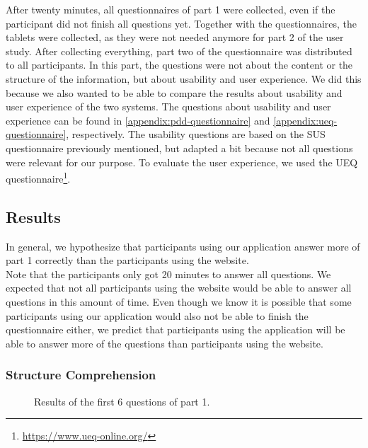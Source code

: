 After twenty minutes, all questionnaires of part 1 were collected, even if the participant did not finish all questions yet. Together with the questionnaires, the tablets were collected, as they were not needed anymore for part 2 of the user study. After collecting everything, part two of the questionnaire was distributed to all participants. In this part, the questions were not about the content or the structure of the information, but about usability and user experience. We did this because we also wanted to be able to compare the results about usability and user experience of the two systems. The questions about usability and user experience can be found in \autoref{appendix:pdd-questionnaire} and \autoref{appendix:ueq-questionnaire}, respectively. The usability questions are based on the SUS questionnaire previously mentioned, but adapted a bit because not all questions were relevant for our purpose. To evaluate the user experience, we used the UEQ questionnaire\footnote{\url{https://www.ueq-online.org/}}.



\subsection{Results}
In general, we hypothesize that participants using our application answer more of part 1 correctly than the participants using the website.\\

Note that the participants only got 20 minutes to answer all questions. We expected that not all participants using the website would be able to answer all questions in this amount of time. Even though we know it is possible that some participants using our application would also not be able to finish the questionnaire either, we predict that participants using the application will be able to answer more of the questions than participants using the website.

\subsubsection{Structure Comprehension}\label{sec:evaluation-pdd-structure-comprehension}

\begin{figure}[H]
	\centering
	\caption{Results of the first 6 questions of part 1.}
	\label{fig:evaluation-pdd-first6}
\end{figure}


